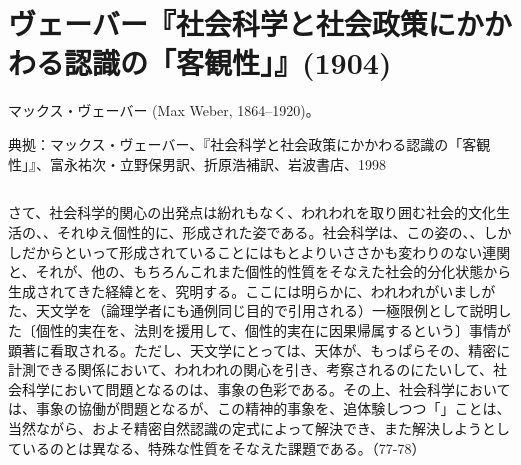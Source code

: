 
\section{ヴェーバー『社会科学と社会政策にかかわる認識の「客観性」』(1904)}


マックス・ヴェーバー (Max Weber, 1864--1920)。





典拠：マックス・ヴェーバー、『社会科学と社会政策にかかわる認識の「客観性」』、富永祐次・立野保男訳、折原浩補訳、岩波書店、1998

\subsection{}


さて、社会科学的関心の出発点は紛れもなく、われわれを取り囲む社会的文化生活の、、それゆえ個性的に、形成された姿である。社会科学は、この姿の、、しかしだからといって形成されていることにはもとよりいささかも変わりのない連関と、それが、他の、もちろんこれまた個性的性質をそなえた社会的分化状態から生成されてきた経緯とを、究明する。ここには明らかに、われわれがいましがた、天文学を（論理学者にも通例同じ目的で引用される）一極限例として説明した〔個性的実在を、法則を援用して、個性的実在に因果帰属するという〕事情が顕著に看取される。ただし、天文学にとっては、天体が、もっぱらその、精密に計測できる関係において、われわれの関心を引き、考察されるのにたいして、社会科学において問題となるのは、事象の色彩である。その上、社会科学においては、事象の協働が問題となるが、この精神的事象を、追体験しつつ「」ことは、当然ながら、およそ精密自然認識の定式によって解決でき、また解決しようとしているのとは異なる、特殊な性質をそなえた課題である。（77-78）

\subsection{}



